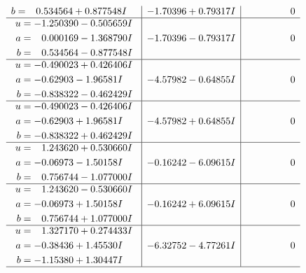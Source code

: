 \documentclass[1p]{elsarticle_modified}
\theoremstyle{definition}
\begin{document}
$$\begin{array}{c|c|c}
\begin{aligned}
b &= \phantom{-}0.534564 + 0.877548 I\end{aligned}
 & -1.70396 + 0.79317 I & \phantom{-0.000000 } 0 \\ \hline\begin{aligned}
u &= -1.250390 - 0.505659 I \\
a &= \phantom{-}0.000169 - 1.368790 I \\
b &= \phantom{-}0.534564 - 0.877548 I\end{aligned}
 & -1.70396 - 0.79317 I & \phantom{-0.000000 } 0 \\ \hline\begin{aligned}
u &= -0.490023 + 0.426406 I \\
a &= -0.62903 - 1.96581 I \\
b &= -0.838322 - 0.462429 I\end{aligned}
 & -4.57982 - 0.64855 I & \phantom{-0.000000 } 0 \\ \hline\begin{aligned}
u &= -0.490023 - 0.426406 I \\
a &= -0.62903 + 1.96581 I \\
b &= -0.838322 + 0.462429 I\end{aligned}
 & -4.57982 + 0.64855 I & \phantom{-0.000000 } 0 \\ \hline\begin{aligned}
u &= \phantom{-}1.243620 + 0.530660 I \\
a &= -0.06973 - 1.50158 I \\
b &= \phantom{-}0.756744 - 1.077000 I\end{aligned}
 & -0.16242 - 6.09615 I & \phantom{-0.000000 } 0 \\ \hline\begin{aligned}
u &= \phantom{-}1.243620 - 0.530660 I \\
a &= -0.06973 + 1.50158 I \\
b &= \phantom{-}0.756744 + 1.077000 I\end{aligned}
 & -0.16242 + 6.09615 I & \phantom{-0.000000 } 0 \\ \hline\begin{aligned}
u &= \phantom{-}1.327170 + 0.274433 I \\
a &= -0.38436 + 1.45530 I \\
b &= -1.15380 + 1.30447 I\end{aligned}
 & -6.32752 - 4.77261 I & \phantom{-0.000000 } 0\\
 \hline 
 \end{array}$$\newpage$$\begin{array}{c|c|c}  

\end{array}$$
\end{document}
